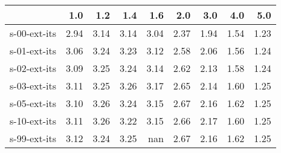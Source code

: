 \begin{tabular}{lrrrrrrrr}
\toprule
{} &  1.0 &  1.2 &  1.4 &  1.6 &  2.0 &  3.0 &  4.0 &  5.0 \\
\midrule
s-00-ext-its & 2.94 & 3.14 & 3.14 & 3.04 & 2.37 & 1.94 & 1.54 & 1.23 \\
s-01-ext-its & 3.06 & 3.24 & 3.23 & 3.12 & 2.58 & 2.06 & 1.56 & 1.24 \\
s-02-ext-its & 3.09 & 3.25 & 3.24 & 3.14 & 2.62 & 2.13 & 1.58 & 1.24 \\
s-03-ext-its & 3.11 & 3.25 & 3.26 & 3.17 & 2.65 & 2.14 & 1.60 & 1.25 \\
s-05-ext-its & 3.10 & 3.26 & 3.24 & 3.15 & 2.67 & 2.16 & 1.62 & 1.25 \\
s-10-ext-its & 3.11 & 3.26 & 3.22 & 3.15 & 2.66 & 2.17 & 1.60 & 1.25 \\
s-99-ext-its & 3.12 & 3.24 & 3.25 &  nan & 2.67 & 2.16 & 1.62 & 1.25 \\
\bottomrule
\end{tabular}
